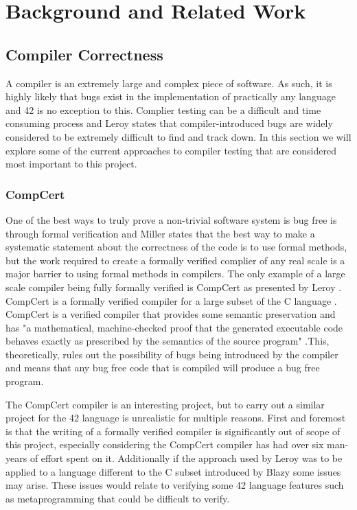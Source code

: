 \chapter{Background and Related Work} \label{C:background}

\section{Compiler Correctness}
A compiler is an extremely large and complex piece of software. As such, it is highly likely that bugs exist in the implementation of practically any language \cite{arnabold} and 42 is no exception to this. Complier testing can be a difficult and time consuming process and Leroy \cite{Leroy:2009} states that compiler-introduced bugs are widely considered to be extremely difficult to find and track down. In this section we will explore some of the current approaches to compiler testing that are considered most important to this project.

\subsection{CompCert}
One of the best ways to truly prove a non-trivial software system is bug free is through formal verification and Miller \cite{Miller:1990} states that the best way to make a systematic statement about the correctness of the code is to use formal methods, but the work required to create a formally verified complier of any real scale is a major barrier to using formal methods in compilers. The only example of a large scale compiler being fully formally verified is CompCert as presented by
Leroy \cite{Leroy:2009}. CompCert is a formally verified compiler for a large subset of the C language \cite{Blazy:2006} \cite{Blazy:2009}. CompCert is a verified compiler that provides some semantic preservation and has
"a mathematical, machine-checked proof that the generated executable code behaves exactly as prescribed by the semantics of the source program" \cite{CompCert}.This, theoretically, rules out the possibility of bugs being introduced by the compiler and means that any bug free code that is compiled will produce a bug free program.

The CompCert compiler is an interesting project, but to carry out a similar project for the 42 language is unrealistic for multiple reasons. First and foremost is that the writing of a formally verified compiler is significantly out of scope of this project, especially considering the CompCert compiler has had over six man-years of effort spent on it. Additionally if the approach used by Leroy was to be applied to a language different to the C subset introduced by Blazy \cite{Blazy:2009} some issues may arise. These issues would relate to verifying some 42 language features such as metaprogramming that could be difficult to verify.


